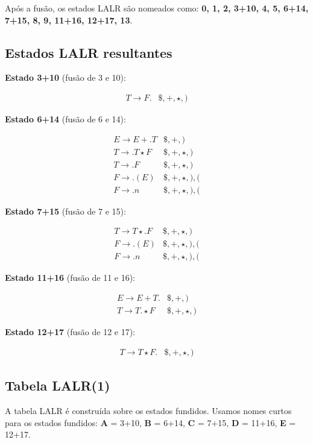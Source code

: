 Após a fusão, os estados LALR são nomeados como: \textbf{0, 1, 2,
3+10, 4, 5, 6+14, 7+15, 8, 9, 11+16, 12+17, 13}.

\subsection{Estados LALR resultantes}

\textbf{Estado 3+10} (fusão de 3 e 10):

\[
\begin{array}{ll}
T \to F . & \$,+,\star,)
\end{array}
\]

\textbf{Estado 6+14} (fusão de 6 e 14):

\[
\begin{array}{ll}
E \to E + . T & \$,+,) \\
T \to . T \star F & \$,+,\star,) \\
T \to . F & \$,+,\star,) \\
F \to . ( E ) & \$,+,\star,),( \\
F \to . n & \$,+,\star,),(
\end{array}
\]

\textbf{Estado 7+15} (fusão de 7 e 15):

\[
\begin{array}{ll}
T \to T \star . F & \$,+,\star,) \\
F \to . ( E ) & \$,+,\star,),( \\
F \to . n & \$,+,\star,),(
\end{array}
\]

\textbf{Estado 11+16} (fusão de 11 e 16):

\[
\begin{array}{ll}
E \to E + T . & \$,+,) \\
T \to T . \star F & \$,+,\star,)
\end{array}
\]

\textbf{Estado 12+17} (fusão de 12 e 17):

\[
\begin{array}{ll}
T \to T \star F . & \$,+,\star,)
\end{array}
\]

\subsection{Tabela LALR(1)}

A tabela LALR é construída sobre os estados fundidos. Usamos nomes
curtos para os estados fundidos: \textbf{A} = 3+10, \textbf{B} =
6+14, \textbf{C} = 7+15, \textbf{D} = 11+16, \textbf{E} = 12+17.

